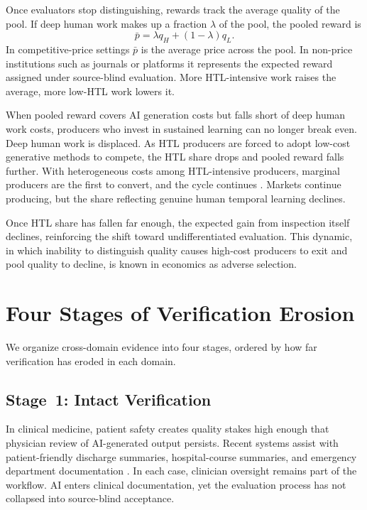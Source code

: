 \documentclass{article}
\theoremstyle{plain}
\theoremstyle{definition}
\theoremstyle{remark}
\begin{document}
\vspace{-1pt}

Once evaluators stop distinguishing, rewards track the average quality of the pool. If deep human work makes up a fraction $\lambda$ of the pool, the pooled reward is
\begin{equation}
\label{eq:pooled}
\bar{p} = \lambda q_H + (1-\lambda) q_L.
\end{equation}
In competitive-price settings $\bar{p}$ is the average price across the pool. In non-price institutions such as journals or platforms it represents the expected reward assigned under source-blind evaluation. More HTL-intensive work raises the average, more low-HTL work lowers it.

When pooled reward covers AI generation costs but falls short of deep human work costs, producers who invest in sustained learning can no longer break even. Deep human work is displaced. As HTL producers are forced to adopt low-cost generative methods to compete, the HTL share drops and pooled reward falls further. With heterogeneous costs among HTL-intensive producers, marginal producers are the first to convert, and the cycle continues \citep{akerlof1970lemons}. Markets continue producing, but the share reflecting genuine human temporal learning declines.

Once HTL share has fallen far enough, the expected gain from inspection itself declines, reinforcing the shift toward undifferentiated evaluation. This dynamic, in which inability to distinguish quality causes high-cost producers to exit and pool quality to decline, is known in economics as adverse selection.





\section{Four Stages of Verification Erosion}
\label{sec:regimes}

We organize cross-domain evidence into four stages, ordered by how far verification has eroded in each domain.

\vspace{1pt}

\subsection{Stage~1: Intact Verification}
\label{sec:stage1}

In clinical medicine, patient safety creates quality stakes high enough that physician review of AI-generated output persists. Recent systems assist with patient-friendly discharge summaries, hospital-course summaries, and emergency department documentation \citep{zaretsky2024discharge, small2025hospitalcourse, song2025eddischarge}. In each case, clinician oversight remains part of the workflow. AI enters clinical documentation, yet the evaluation process has not collapsed into source-blind acceptance.
\end{document}

